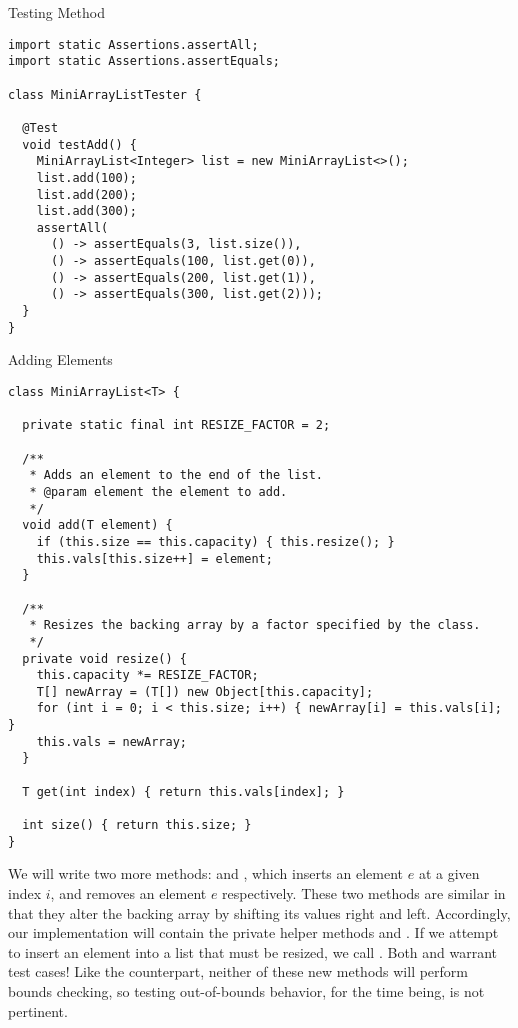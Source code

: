 \begin{cl}[]{Testing   Method}
\begin{lstlisting}[language=MyJava]
import static Assertions.assertAll;
import static Assertions.assertEquals;

class MiniArrayListTester {

  @Test
  void testAdd() {
    MiniArrayList<Integer> list = new MiniArrayList<>();
    list.add(100);
    list.add(200);
    list.add(300);
    assertAll(
      () -> assertEquals(3, list.size()),
      () -> assertEquals(100, list.get(0)),
      () -> assertEquals(200, list.get(1)),
      () -> assertEquals(300, list.get(2)));
  }
}
\end{lstlisting}
\end{cl}

\begin{cl}[]{ Adding Elements}
\begin{lstlisting}[language=MyJava]
class MiniArrayList<T> {

  private static final int RESIZE_FACTOR = 2;

  /**
   * Adds an element to the end of the list.
   * @param element the element to add.
   */
  void add(T element) {
    if (this.size == this.capacity) { this.resize(); }
    this.vals[this.size++] = element;
  }

  /**
   * Resizes the backing array by a factor specified by the class.
   */
  private void resize() {
    this.capacity *= RESIZE_FACTOR;
    T[] newArray = (T[]) new Object[this.capacity];
    for (int i = 0; i < this.size; i++) { newArray[i] = this.vals[i]; }
    this.vals = newArray;
  }

  T get(int index) { return this.vals[index]; }

  int size() { return this.size; }
}
\end{lstlisting}
\end{cl}

We will write two more methods:  and , which inserts an element $e$ at a given index $i$, and removes an element $e$ respectively. These two methods are similar in that they alter the backing array by shifting its values right and left. Accordingly, our implementation will contain the private helper methods  and . If we attempt to insert an element into a list that must be resized, we call . Both  and  warrant test cases! Like the  counterpart, neither of these new methods will perform bounds checking, so testing out-of-bounds behavior, for the time being, is not pertinent.

